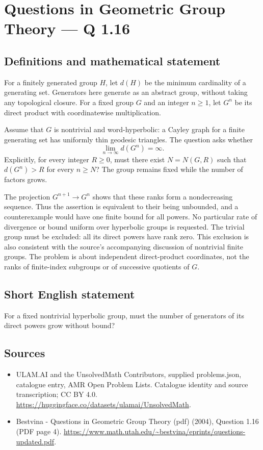 \documentclass[11pt,a4paper]{article}
\begin{document}
\section*{Questions in Geometric Group Theory — Q 1.16}\label{statement}

\subsection{Definitions and mathematical statement}
For a finitely generated group $H$, let $d(H)$ be the minimum cardinality of a generating set. Generators here generate as an abstract group, without taking any topological closure. For a fixed group $G$ and an integer $n\geq1$, let $G^n$ be its direct product with coordinatewise multiplication.

Assume that $G$ is nontrivial and word-hyperbolic: a Cayley graph for a finite generating set has uniformly thin geodesic triangles. The question asks whether
\[
 \lim_{n\to\infty}d(G^n)=\infty.
\]
Explicitly, for every integer $R\geq0$, must there exist $N=N(G,R)$ such that $d(G^n)>R$ for every $n\geq N$? The group remains fixed while the number of factors grows.

The projection $G^{n+1}\to G^n$ shows that these ranks form a nondecreasing sequence. Thus the assertion is equivalent to their being unbounded, and a counterexample would have one finite bound for all powers. No particular rate of divergence or bound uniform over hyperbolic groups is requested. The trivial group must be excluded: all its direct powers have rank zero. This exclusion is also consistent with the source's accompanying discussion of nontrivial finite groups. The problem is about independent direct-product coordinates, not the ranks of finite-index subgroups or of successive quotients of $G$.
\subsection{Short English statement}
For a fixed nontrivial hyperbolic group, must the number of generators of its direct powers grow without bound?
\subsection{Sources}
\begin{itemize}
\item[S1] ULAM.AI and the UnsolvedMath Contributors, supplied problems.json, catalogue entry, AMR Open Problem Lists. Catalogue identity and source transcription; CC BY 4.0.
\url{https://huggingface.co/datasets/ulamai/UnsolvedMath}.
\item[S2] Bestvina - Questions in Geometric Group Theory (pdf) (2004), Question 1.16 (PDF page 4). 
\url{https://www.math.utah.edu/~bestvina/eprints/questions-updated.pdf}.
\end{itemize}
\end{document}
